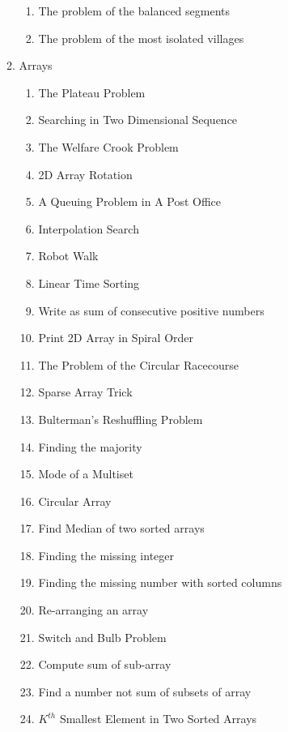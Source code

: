 \begin{enumerate}[label=\Roman*]
\begin{enumerate}[label=\arabic*.]
\begin{enumerate}[label*=\arabic*.]
              \item The problem of the balanced segments
              \item The problem of the most isolated villages
            \end{enumerate}  
      \item Arrays
          \begin{enumerate}[label*=\arabic*.]
              \item The Plateau Problem
              \item Searching in Two Dimensional Sequence
              \item The Welfare Crook Problem
              \item 2D Array Rotation
              \item A Queuing Problem in A Post Office
              \item Interpolation Search
              \item Robot Walk
              \item Linear Time Sorting
              \item Write as sum of consecutive positive numbers
              \item Print 2D Array in Spiral Order
              \item The Problem of the Circular Racecourse
              \item Sparse Array Trick
              \item Bulterman'{}s Reshuffling Problem
              \item Finding the majority
              \item Mode of a Multiset
              \item Circular Array
              \item Find Median of two sorted arrays
              \item Finding the missing integer
              \item Finding the missing number with sorted columns
              \item Re-arranging an array
              \item Switch and Bulb Problem
              \item Compute sum of sub-array
              \item Find a number not sum of subsets of array
              \item $K^{th}$ Smallest Element in Two Sorted Arrays

\end{enumerate}
\end{enumerate}
\end{enumerate}
